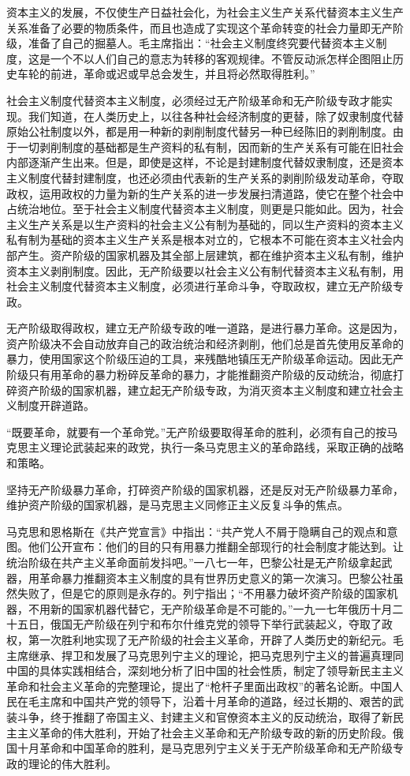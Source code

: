 \documentclass{book}
\begin{document}
资本主义的发展，不仅使生产日益社会化，为社会主义生产关系代替资本主义生产关系准备了必要的物质条件，而且也造成了实现这个革命转变的社会力量即无产阶级，准备了自己的掘墓人。毛主席指出：“社会主义制度终究要代替资本主义制度，这是一个不以人们自己的意志为转移的客观规律。不管反动派怎样企图阻止历史车轮的前进，革命或迟或早总会发生，并且将必然取得胜利。”

社会主义制度代替资本主义制度，必须经过无产阶级革命和无产阶级专政才能实现。我们知道，在人类历史上，以往各种社会经济制度的更替，除了奴隶制度代替原始公社制度以外，都是用一种新的剥削制度代替另一种已经陈旧的剥削制度。由于一切剥削制度的基础都是生产资料的私有制，因而新的生产关系有可能在旧社会内部逐渐产生出来。但是，即使是这样，不论是封建制度代替奴隶制度，还是资本主义制度代替封建制度，也还必须由代表新的生产关系的剥削阶级发动革命，夺取政权，运用政权的力量为新的生产关系的进一步发展扫清道路，使它在整个社会中占统治地位。至于社会主义制度代替资本主义制度，则更是只能如此。因为，社会主义生产关系是以生产资料的社会主义公有制为基础的，同以生产资料的资本主义私有制为基础的资本主义生产关系是根本对立的，它根本不可能在资本主义社会内部产生。资产阶级的国家机器及其全部上层建筑，都在维护资本主义私有制，维护资本主义剥削制度。因此，无产阶级要以社会主义公有制代替资本主义私有制，用社会主义制度代替资本主义制度，必须进行革命斗争，夺取政权，建立无产阶级专政。

无产阶级取得政权，建立无产阶级专政的唯一道路，是进行暴力革命。这是因为，资产阶级决不会自动放弃自己的政治统治和经济剥削，他们总是首先使用反革命的暴力，使用国家这个阶级压迫的工具，来残酷地镇压无产阶级革命运动。因此无产阶级只有用革命的暴力粉碎反革命的暴力，才能推翻资产阶级的反动统治，彻底打碎资产阶级的国家机器，建立起无产阶级专政，为消灭资本主义制度和建立社会主义制度开辟道路。

“既要革命，就要有一个革命党。”无产阶级要取得革命的胜利，必须有自己的按马克思主义理论武装起来的政党，执行一条马克思主义的革命路线，采取正确的战略和策略。

坚持无产阶级暴力革命，打碎资产阶级的国家机器，还是反对无产阶级暴力革命，维护资产阶级的国家机器，是马克思主义同修正主义反复斗争的焦点。

马克思和恩格斯在《共产党宣言》中指出：“共产党人不屑于隐瞒自己的观点和意图。他们公开宣布：他们的目的只有用暴力推翻全部现行的社会制度才能达到。让统治阶级在共产主义革命面前发抖吧。”一八七一年，巴黎公社是无产阶级拿起武器，用革命暴力推翻资本主义制度的具有世界历史意义的第一次演习。巴黎公社虽然失败了，但是它的原则是永存的。列宁指出；“不用暴力破坏资产阶级的国家机器，不用新的国家机器代替它，无产阶级革命是不可能的。”一九一七年俄历十月二十五日，俄国无产阶级在列宁和布尔什维克党的领导下举行武装起义，夺取了政权，第一次胜利地实现了无产阶级的社会主义革命，开辟了人类历史的新纪元。毛主席继承、捍卫和发展了马克思列宁主义的理论，把马克思列宁主义的普遍真理同中国的具体实践相结合，深刻地分析了旧中国的社会性质，制定了领导新民主主义革命和社会主义革命的完整理论，提出了“枪杆子里面出政权”的著名论断。中国人民在毛主席和中国共产党的领导下，沿着十月革命的道路，经过长期的、艰苦的武装斗争，终于推翻了帝国主义、封建主义和官僚资本主义的反动统治，取得了新民主主义革命的伟大胜利，开始了社会主义革命和无产阶级专政的新的历史阶段。俄国十月革命和中国革命的胜利，是马克思列宁主义关于无产阶级革命和无产阶级专政的理论的伟大胜利。
\end{document}
